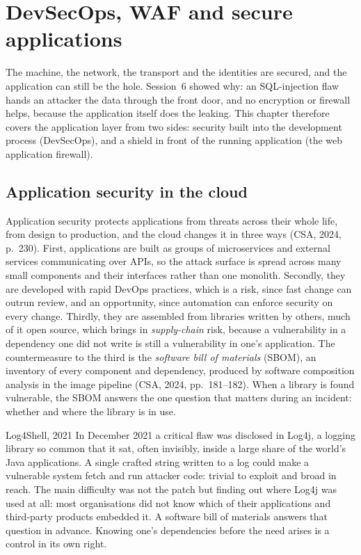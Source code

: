 \chapter{DevSecOps, WAF and secure applications}

The machine, the network, the transport and the identities are secured, and
the application can still be the hole. Session~6 showed why: an
SQL-injection flaw hands an attacker the data through the front door, and no
encryption or firewall helps, because the application itself does the
leaking. This chapter therefore covers the application layer from two sides:
security built into the development process (DevSecOps), and a shield in
front of the running application (the web application firewall).

\section{Application security in the cloud}

Application security protects applications from threats across their whole
life, from design to production, and the cloud changes it in three ways
(CSA, 2024, p.~230). First, applications are built as groups of
microservices and external services communicating over APIs, so the attack
surface is spread across many small components and their interfaces rather
than one monolith. Secondly, they are developed with rapid DevOps practices,
which is a risk, since fast change can outrun review, and an opportunity,
since automation can enforce security on every change. Thirdly, they are
assembled from libraries written by others, much of it open source, which
brings in \emph{supply-chain} risk, because a vulnerability in a dependency
one did not write is still a vulnerability in one's application. The
countermeasure to the third is the \emph{software bill of materials} (SBOM),
an inventory of every component and dependency, produced by software
composition analysis in the image pipeline (CSA, 2024, pp.~181--182). When a
library is found vulnerable, the SBOM answers the one question that matters
during an incident: whether and where the library is in use.

\begin{realworld}{Log4Shell, 2021}
In December 2021 a critical flaw was disclosed in Log4j, a logging library so
common that it sat, often invisibly, inside a large share of the world's Java
applications. A single crafted string written to a log could make a vulnerable
system fetch and run attacker code: trivial to exploit and broad in reach. The
main difficulty was not the patch but finding out where Log4j was used at
all: most organisations did not know which of their applications and
third-party products embedded it. A software bill of materials answers that
question in advance. Knowing one's dependencies before the need arises is a
control in its own right.
\end{realworld}

